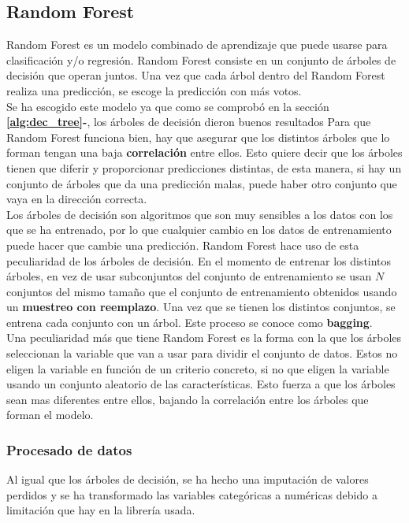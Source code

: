 \subsection{Random Forest}
Random Forest es un modelo  combinado de aprendizaje que puede usarse para clasificación y/o regresión. Random Forest consiste en un conjunto de árboles de decisión que operan juntos. Una vez que cada árbol dentro del Random Forest realiza una predicción, se escoge la predicción con más votos. \\ Se ha escogido este modelo ya que como se comprobó en la sección \textbf{\ref{alg:dec_tree}-}, los árboles de decisión dieron buenos resultados
\linebreak
Para que Random Forest funciona bien, hay que asegurar que los distintos árboles que lo forman tengan una baja \textbf{correlación} entre ellos. Esto quiere decir que los árboles tienen que diferir y proporcionar predicciones distintas, de esta manera, si hay un conjunto de  árboles que da una predicción malas, puede haber otro conjunto que vaya en la dirección correcta. \\
\linebreak
Los árboles de decisión son algoritmos que son muy sensibles a los datos con los que se ha entrenado, por lo que cualquier cambio en los datos de entrenamiento puede hacer que cambie una predicción. Random Forest hace uso de esta peculiaridad de los árboles de decisión.
En el momento de entrenar los distintos árboles, en vez de usar subconjuntos del conjunto de entrenamiento se usan $N$ conjuntos del mismo tamaño que el conjunto de entrenamiento obtenidos usando un \textbf{muestreo con reemplazo}. Una vez que se tienen los distintos conjuntos, se entrena cada conjunto con un árbol. Este proceso se conoce como \textbf{bagging}.\\
\linebreak
Una peculiaridad más que tiene Random Forest es la forma con la que los árboles seleccionan la variable que van a usar para dividir el conjunto de datos. Estos no eligen la variable en función de un criterio concreto, si no que eligen la variable usando un conjunto aleatorio de las características.  Esto fuerza a que los árboles sean mas diferentes entre ellos, bajando la correlación entre los árboles que forman el modelo.
\subsubsection{Procesado de datos}
Al igual que los árboles de decisión, se ha hecho una imputación de valores perdidos y se ha transformado las variables categóricas a numéricas debido a limitación que hay en la librería usada.
\pagebreak
